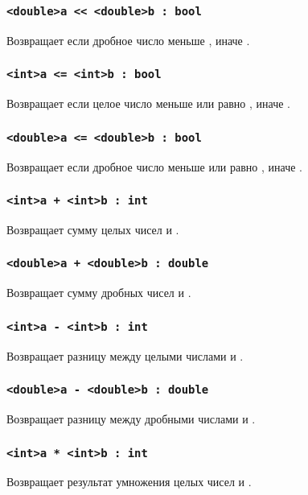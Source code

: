 \documentclass[a4paper, 14pt]{extarticle}
\begin{document}
\subsubsection{\lstinline`<double>a << <double>b : bool`}
Возвращает  если дробное число  меньше , иначе .

\subsubsection{\lstinline`<int>a <= <int>b : bool`}
Возвращает  если целое число  меньше или равно , иначе .

\subsubsection{\lstinline`<double>a <= <double>b : bool`}
Возвращает  если дробное число  меньше или равно , иначе .


\subsubsection{\lstinline`<int>a + <int>b : int`}
Возвращает сумму целых чисел  и .

\subsubsection{\lstinline`<double>a + <double>b : double`}
Возвращает сумму дробных чисел  и .

\subsubsection{\lstinline`<int>a - <int>b : int`}
Возвращает разницу между целыми числами  и .

\subsubsection{\lstinline`<double>a - <double>b : double`}
Возвращает разницу между дробными числами  и .

\subsubsection{\lstinline`<int>a * <int>b : int`}
Возвращает результат умножения целых чисел  и .
\end{document}
